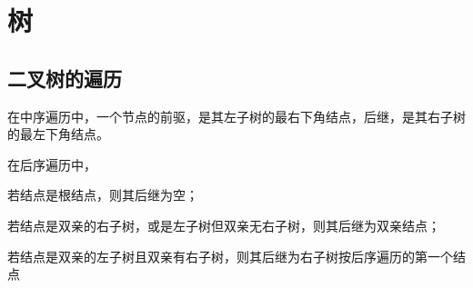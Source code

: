 \chapter{树}

\section{二叉树的遍历} %
\label{sec:binaryTreeTraversal}

在中序遍历中，一个节点的前驱，是其左子树的最右下角结点，后继，是其右子树的最左下角结点。

在后序遍历中，
\begindot
\item 若结点是根结点，则其后继为空；
\item 若结点是双亲的右子树，或是左子树但双亲无右子树，则其后继为双亲结点；
\item 若结点是双亲的左子树且双亲有右子树，则其后继为右子树按后序遍历的第一个结点
\myenddot



